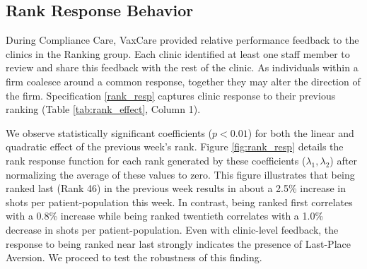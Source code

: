  \subsection{Rank Response Behavior} \label{cc_res_rankResp}
 During Compliance Care, VaxCare provided relative performance feedback to the clinics in the Ranking group. Each clinic identified at least one staff member to review and share this feedback with the rest of the clinic. As individuals within a firm coalesce around a common response, together they may alter the direction of the firm. Specification \ref{rank_resp} captures clinic response to their previous ranking (Table \ref{tab:rank_effect}, Column 1). 
 
 We observe statistically significant coefficients ($p < 0.01$) for both the linear and quadratic effect of the previous week’s rank. Figure \ref{fig:rank_resp} details the rank response function for each rank generated by these coefficients ($\lambda_1,\lambda_2$) after normalizing the average of these values to zero. This figure illustrates that being ranked last (Rank 46) in the previous week results in about a 2.5\% increase in shots per patient-population this week. In contrast, being ranked first correlates with a 0.8\% increase while being ranked twentieth correlates with a 1.0\% decrease in shots per patient-population. Even with clinic-level feedback, the response to being ranked near last strongly indicates the presence of Last-Place Aversion. We proceed to test the robustness of this finding.

